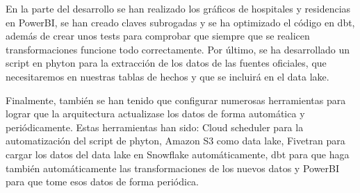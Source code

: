 En la parte del desarrollo se han realizado los gráficos de hospitales y residencias en PowerBI, se han creado claves subrogadas y se ha optimizado el código en dbt, además de crear unos tests para comprobar que siempre que se realicen transformaciones funcione todo correctamente. Por último, se ha desarrollado un script en phyton para la extracción de los datos de las fuentes oficiales, que necesitaremos en nuestras tablas de hechos y que se incluirá en el data lake.

Finalmente, también se han tenido que configurar numerosas herramientas para lograr que la arquitectura actualizase los datos de forma automática y periódicamente. Estas herramientas han sido: Cloud scheduler para la automatización del script de phyton, Amazon S3 como data lake, Fivetran para cargar los datos del data lake en Snowflake automáticamente, dbt para que haga también automáticamente las transformaciones de los nuevos datos y PowerBI para que tome esos datos de forma periódica.



